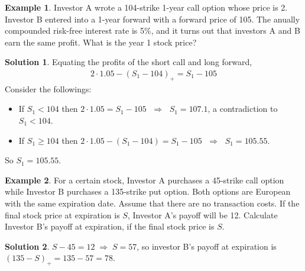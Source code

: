 \documentclass[10pt,handout]{beamer}
\newcommand{\ie}{\;\Longrightarrow\;}
\theoremstyle{definition}
\newtheorem*{ex}{Example}
\newtheorem*{sol}{Solution}
\begin{document}
\begin{frame}
  \begin{ex}
    Investor A wrote a 104-strike 1-year call option whose price is 2. Investor B entered into a 1-year forward with a forward price of 105. The anually compounded risk-free interest rate is 5\%, and it turns out that investors A and B earn the same profit. What is the year 1 stock price? 
  \end{ex}
  \begin{sol}
    Equating the profits of the short call and long forward, 
    \begin{align*}
      2\cdot 1.05 - (S_1 - 104)_+ = S_1 - 105
    \end{align*}
    Consider the followings:
    \begin{itemize}
      \item If $S_1 < 104$ then $2\cdot 1.05 = S_1 - 105$ $\ie$ $S_1 = 107.1$, a contradiction to $S_1 < 104$. 
      \item If $S_1 \geqslant 104$ then $2\cdot1.05 - (S_1 - 104)  = S_1 - 105$ $\ie$ $S_1 = 105.55$. 
    \end{itemize}
    So $S_1 = 105.55$.
  \end{sol}
\end{frame}

\begin{frame}
  \begin{ex}
    For a certain stock, Investor A purchases a 45-strike call option while Investor B purchases a 135-strike put option. Both options
are European with the same expiration date. Assume that there are no transaction costs. If the final stock price at expiration is $S$, Investor A's payoff will be 12. Calculate Investor B's payoff at expiration, if the final stock price is $S$.
  \end{ex}
  \begin{sol}
    $S - 45 = 12\ie S = 57$, so investor B's payoff at expiration is $(135 - S)_+ = 135 - 57 = 78$.
  \end{sol}
\end{frame}
\end{document}
